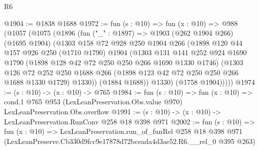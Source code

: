 \begin{lexlean}{R6}
\begin{coremodule}
@1904 := @1838 @1688
@1972 := fun (s : @10) =>
  fun (x : @10) =>
  @988
    (@1057
      (@1075
        (@1896
          (fun ("_" : @1897) =>
          @1903
            (@262 @1904 @266)
            (@1695 @1904)
            (@1303
              @158
              @72
              @928
              @250
              @1904
              @266
              (@1898
                @120
                @44
                @157
                @926
                @250
                (@1710 @1790)
                @1904
                (@1303
                  @131
                  @141
                  @252
                  @924
                  @1690
                  @1790
                  (@1898 @128 @42 @72 @250 @250 @266 @1690 @1330 @1746)
                  (@1303
                    @126
                    @72
                    @252
                    @250
                    @1688
                    @266
                    (@1898 @123 @42 @72 @250 @250 @266 @1688 @1330 @1729)
                    @1330))
                (@1884 @1688))
              @1330)
            (@1758 @1904)))))
@1974 := (s : @10) -> (x : @10) -> @765
@1984 := fun (s : @10) =>
  fun (x : @10) =>
  cond.{1} @765 @953 (LexLeanPreservation.Obs.value @970) LexLeanPreservation.Obs.overflow
@1991 := (s : @10) -> (x : @10) -> LexLeanPreservation.RunConv @258 @18 @398 @971
@2002 := fun (s : @10) =>
  fun (x : @10) =>
  LexLeanPreservation.run_of_funRel
    @258
    @18
    @398
    @971
    (LexLeanPreserve.Cb330d9fcc9e17878d72bceada4d3ae52.R6.__rel_0 @395 @263)
\end{coremodule}
\end{lexlean}
